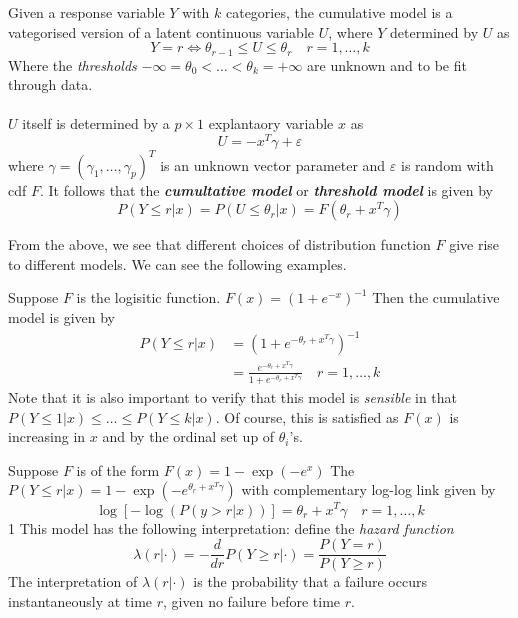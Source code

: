 \begin{definition}
    Given a response variable $Y$ with $k$ categories, the cumulative model is a vategorised version of a latent continuous variable $U$, where $Y$ determined by $U$ as
    $$Y = r \iff \theta_{r-1}\leq U\leq\theta_r \quad r=1,\dots,k$$
    Where the \textit{thresholds} $-\infty=\theta_0<\dots<\theta_k=+\infty$ are unknown and to be fit through data. \\
    \\
    $U$ itself is determined by a $p\times 1$ explantaory variable $x$ as
    $$U = -x^T\gamma+\varepsilon$$
    where $\gamma=(\gamma_1,\dots,\gamma_p)^T$ is an unknown vector parameter and $\varepsilon$ is random with cdf $F$. It follows that the \textit{\textbf{cumultative model}} or \textit{\textbf{threshold model}} is given by
    $$P(Y\leq r | x) = P(U\leq \theta_r | x) = F(\theta_r + x^T\gamma)$$ 
\end{definition}
From the above, we see that different choices of distribution function $F$ give rise to different models. We can see the following examples. 
\begin{eg}
    Suppose $F$ is the logisitic function. $F(x) = (1+e^{-x})^{-1}$ Then the cumulative model is given by 
    \begin{align*}
        P(Y\leq r |x) &= (1+e^{-\theta_r + x^T\gamma})^{-1} \\
        &= \frac{e^{-\theta_r + x^T\gamma}}{1+e^{-\theta_r + x^T\gamma}} \quad r=1,\dots,k
    \end{align*}
    Note that it is also important to verify that this model is \textit{sensible} in that $P(Y\leq1|x)\leq\dots\leq P(Y\leq k|x)$. Of course, this is satisfied as $F(x)$ is increasing in $x$ and by the ordinal set up of $\theta_i$'s.
\end{eg}
\begin{eg}
    Suppose $F$ is of the form
    $F(x) = 1 - \exp(-e^{x})$ 
    The $P(Y\leq r |x) = 1-\exp(-e^{\theta_r + x^T\gamma })$ with complementary log-log link given by
    $$\log[-\log(P(y>r|x))] = \theta_r + x^T\gamma \quad r = 1,\dots,k$$1
    This model has the following interpretation: define the \textit{hazard function}
    $$\lambda(r|\cdot) = -\frac{d}{dr}P(Y\geq r|\cdot) = \frac{P(Y=r)}{P(Y\geq r)}$$
    The interpretation of $\lambda(r|\cdot)$ is the probability that a failure occurs instantaneously at time $r$, given no failure before time $r$.
\end{eg}
